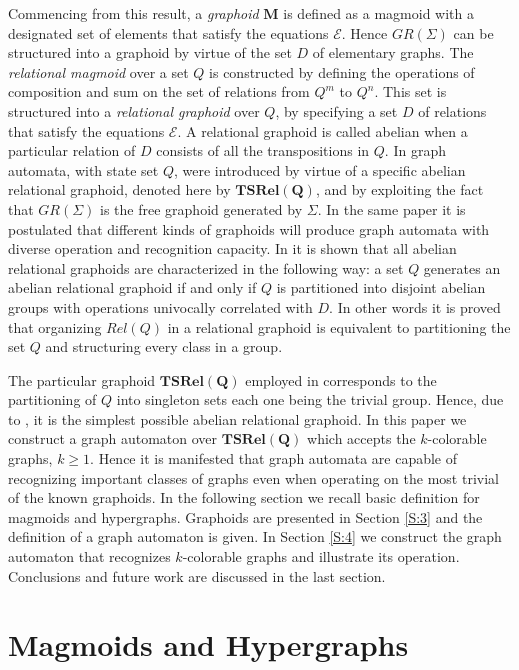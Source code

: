 \documentclass[runningheads,a4paper]{llncs}
\begin{document}
Commencing from this result, a \emph{graphoid} $\mathbf{M}$ is defined as a magmoid with a designated set of elements that satisfy the equations $\mathcal{E}$. Hence $GR(\Sigma)$ can be structured into a graphoid by virtue of the set $D$ of elementary graphs. The \emph{relational magmoid} over a set $Q$ is constructed by defining the operations of composition and sum on the set of relations from $Q^m$ to $Q^n$. This set is structured into a \emph{relational graphoid} over $Q$, by specifying a set $D$ of relations that satisfy the equations $\mathcal{E}$. A relational graphoid is called abelian when a particular relation of $D$ consists of all the transpositions in $Q$.
In \cite{BK3} graph automata, with state set $Q$, were introduced by virtue of a specific abelian relational graphoid, denoted here by $\mathbf{TSRel(Q)}$, and by exploiting the fact that $GR(\Sigma)$ is the free graphoid generated by $\Sigma$. In the same paper it is postulated that different kinds of graphoids will produce graph automata with diverse operation and recognition capacity. In \cite{Kal2} it is shown that all abelian relational graphoids are characterized in the following way: a set $Q$ generates an abelian relational graphoid if and only if $Q$ is partitioned  into  disjoint abelian groups with operations univocally correlated with $D$. In other words it is proved that organizing $Rel(Q)$ in a relational graphoid is equivalent to partitioning the set $Q$ and structuring every class in a group.

The particular graphoid $\mathbf{TSRel(Q)}$ employed in \cite{BK3} corresponds to the partitioning of $Q$ into singleton sets each one being the trivial group. Hence, due to \cite{Kal2}, it is the simplest possible abelian relational graphoid. In this paper we construct a graph automaton over $\mathbf{TSRel(Q)}$ which accepts the $k$-colorable graphs, $k\geq 1$. Hence it is manifested that graph automata are capable of recognizing important classes of graphs even when operating on the most trivial of the known graphoids. In the following section we recall basic definition for magmoids and hypergraphs. Graphoids are presented in Section \ref{S:3} and the definition of a graph automaton is given. In Section \ref{S:4} we construct the graph automaton that recognizes $k$-colorable graphs and illustrate its operation. Conclusions and future work are discussed in the last section.


\section{Magmoids and Hypergraphs}
\end{document}
